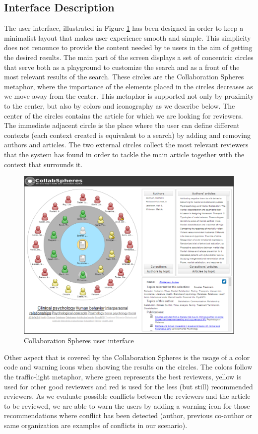 \subsection{Interface Description}
The user interface, illustrated in Figure \ref{fig:screenshot} has been designed in order to keep a minimalist layout that makes user experience smooth and simple. This simplicity does not renounce to provide the content needed by te users in the aim of getting the desired results. The main part of the screen displays a set of concentric circles that serve both as a playground to customize the search and as a front of the most relevant results of the search. These circles are the Collaboration Spheres metaphor, where the importance of the elements placed in the circles decreases as we move away from the center. This metaphor is supported not only by proximity to the center, but also by colors and iconography as we describe below.
The center of the circles contains the article for which we are looking for reviewers. The immediate adjacent circle is the place where the user can define different contexts (each context created is equivalent to a search) by adding and removing authors and articles. The two external circles collect the most relevant reviewers that the system has found in order to tackle the main article together with the context that surrounds it.
\begin{figure}[h!t!]
\centering
\includegraphics[scale=0.4]{img/CollabAPA.png}
\caption{Collaboration Spheres user interface}
\label{fig:screenshot}
\end{figure}
Other aspect that is covered by the Collaboration Spheres is the usage of a color code and warning icons when showing the results on the circles. The colors follow the traffic-light metaphor, where green represents the best reviewers, yellow is used for other good reviewers and red is used for the less (but still) recommended reviewers. As we evaluate possible conflicts between the reviewers and the article to be reviewed, we are able to warn the users by adding a warning icon for those recommendations where conflict has been detected (author, previous co-author or same organization are examples of conflicts in our scenario). 

